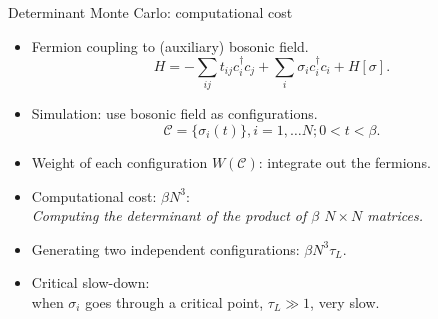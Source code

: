 \documentclass[xcolor=table, 10pt, aspectratio=169]{beamer}
\begin{document}
\begin{frame}{Determinant Monte Carlo: computational cost}
\begin{itemize}
  \item Fermion coupling to (auxiliary) bosonic field.
  \[H=-\sum_{ij}t_{ij}c_i^\dagger c_j
  +\sum_i\sigma_ic_i^\dagger c_i
  +H[\sigma].\]
  \item Simulation: use bosonic field as configurations.
  \[\mathcal C=\{\sigma_i(t)\}, i=1,\ldots N;0<t<\beta.\]
  \item Weight of each configuration $W(\mathcal C)$: integrate out the fermions.
  \item Computational cost: $\beta N^3$:\\
  \emph{\small Computing the determinant of the product of $\beta$ $N\times N$ matrices.}
  \item Generating two independent configurations: $\beta N^3\tau_L$.
  \item Critical slow-down:\\ when $\sigma_i$ goes through a critical point, $\tau_L\gg1$, very slow.
\end{itemize}
\end{frame}
\end{document}
